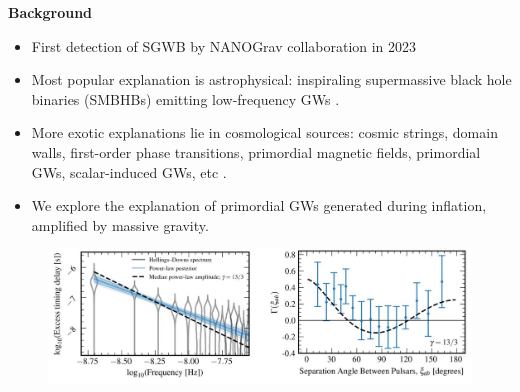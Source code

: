 \documentclass{beamer}                             %
\newcommand{\blocktitle}[1]{{\Large \textbf{#1}}}
\begin{document}
\begin{frame}[t]
\begin{columns}[T]
\begin{column}{0.30\textwidth}
  \begin{tcolorbox}
    \blocktitle{Background}
    \begin{itemize}
        \item First detection of SGWB by NANOGrav collaboration in 2023 \cite{Agazie:2023}
        \item Most popular explanation is astrophysical: inspiraling supermassive black hole binaries (SMBHBs) emitting low-frequency GWs \cite{Burke-Spolaor:2018bvk}.
        \item More exotic explanations lie in cosmological sources: cosmic strings, domain walls, first-order phase transitions, primordial magnetic fields, primordial GWs, scalar-induced GWs, etc \cite{Afzal:2023}.  
        \item We explore the explanation of primordial GWs generated during inflation, amplified by massive gravity.
    \end{itemize}
    \begin{figure}[t]
      \centering
      \includegraphics[width=\linewidth]{ng15.png}  
      \label{fig:ng15}
    \end{figure}
  \end{tcolorbox}


\end{column}
\end{columns}
\end{frame}
\end{document}
